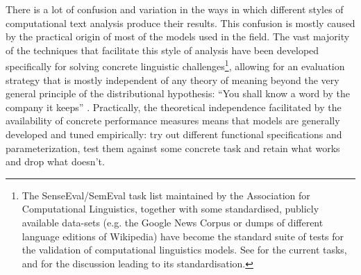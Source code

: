 There is a lot of confusion and variation in the ways in which different styles of computational text analysis produce their results.
This confusion is mostly caused by the practical origin of most of the models used in the field.
The vast majority of the techniques that facilitate this style of analysis have been developed specifically for solving concrete linguistic challenges\footnote{
    \label{foot:semeval}
    The SenseEval/SemEval task list maintained by the Association for Computational Linguistics, together with some standardised, publicly available data-sets (e.g. the Google News Corpus or dumps of different language editions of Wikipedia) have become the standard suite of tests for the validation of computational linguistics models. See \citet{zotero-2731} for the current tasks, and \citet{resnik2012} for the discussion leading to its standardisation.
}, allowing for an evaluation strategy that is mostly independent of any theory of meaning \citep[pp. 54]{sahlgren2006} beyond the very general principle of the distributional hypothesis: ``You shall know a word by the company it keeps'' \autocite{firth1957}.
Practically, the theoretical independence facilitated by the availability of concrete performance measures means that models are generally developed and tuned empirically: try out different functional specifications and parameterization, test them against some concrete task and retain what works and drop what doesn't.

